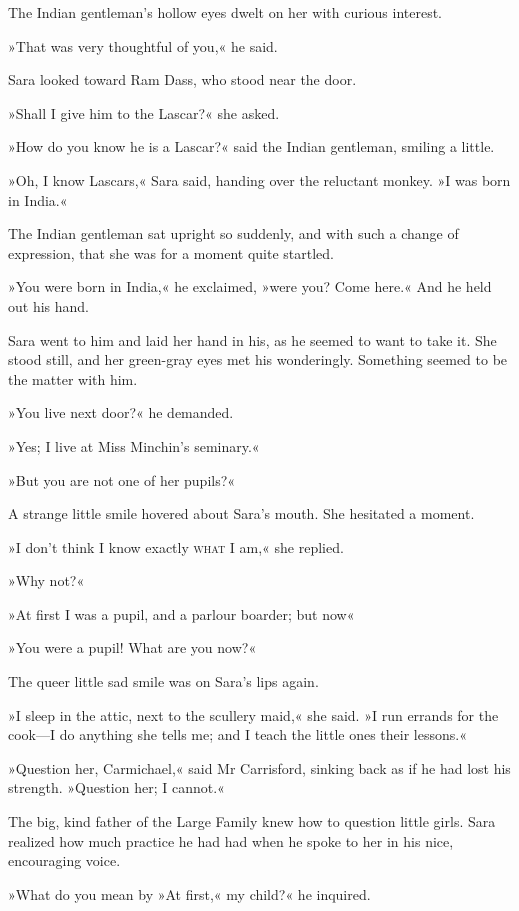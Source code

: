 The Indian gentleman's hollow eyes dwelt on her with curious interest.

»That was very thoughtful of you,« he said.

Sara looked toward Ram Dass, who stood near the door.

»Shall I give him to the Lascar?« she asked.

»How do you know he is a Lascar?« said the Indian gentleman, smiling a little.

»Oh, I know Lascars,« Sara said, handing over the reluctant monkey. »I was born in India.«

The Indian gentleman sat upright so suddenly, and with such a change of expression, that she was for a moment quite startled.

»You were born in India,« he exclaimed, »were you? Come here.« And he held out his hand.

Sara went to him and laid her hand in his, as he seemed to want to take it. She stood still, and her green-gray eyes met his wonderingly. Something seemed to be the matter with him.

»You live next door?« he demanded.

»Yes; I live at Miss Minchin's seminary.«

»But you are not one of her pupils?«

A strange little smile hovered about Sara's mouth. She hesitated a moment.

»I don't think I know exactly \textsc{what} I am,« she replied.

»Why not?«

»At first I was a pupil, and a parlour boarder; but now\longdash«

»You were a pupil! What are you now?«

The queer little sad smile was on Sara's lips again.

»I sleep in the attic, next to the scullery maid,« she said. »I run errands for the cook—I do anything she tells me; and I teach the little ones their lessons.«

»Question her, Carmichael,« said Mr Carrisford, sinking back as if he had lost his strength. »Question her; I cannot.«

The big, kind father of the Large Family knew how to question little girls. Sara realized how much practice he had had when he spoke to her in his nice, encouraging voice.

»What do you mean by »At first,« my child?« he inquired.

